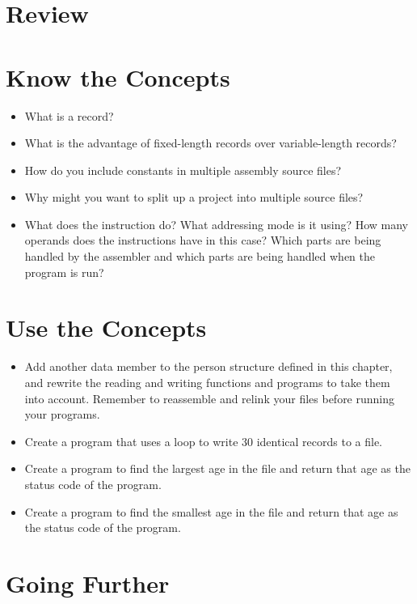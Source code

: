 \section{Review}

\section{Know the Concepts}

\begin{itemize}\item What is a record? 
\item What is the advantage of fixed-length records over variable-length records? 
\item How do you include constants in multiple assembly source files? 
\item Why might you want to split up a project into multiple source files? 
\item What does the instruction  do?  What addressing mode is it using?  How many operands does the  instructions have in this case?  Which parts are being handled by the assembler and which parts are being handled when the program is run? 
\end{itemize}

\section{Use the Concepts}

\begin{itemize}\item Add another data member to the person structure defined in this chapter, and rewrite the reading and writing functions and programs to take them into account.  Remember to reassemble and relink your files before running your programs. 
\item Create a program that uses a loop to write 30 identical records to a file. 
\item Create a program to find the largest age in the file and return that age as the status code of the program. 
\item Create a program to find the smallest age in the file and return that age as the status code of the program. 
\end{itemize}

\section{Going Further}

